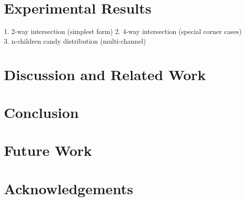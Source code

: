 \documentclass[conference]{IEEEtran}
\begin{document}
\section{Experimental Results}
1. 2-way intersection (simplest form)
2. 4-way intersection (special corner cases)
3. n-children candy distribution (multi-channel)


\section{Discussion and Related Work}




\section{Conclusion}


\section{Future Work}


\section{Acknowledgements}
\end{document}
